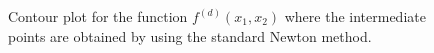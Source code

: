 \documentclass[a4paper,11pt]{article}
\begin{document}
	\begin{figure}[H]
		\centering
		 \quad
		\caption{Contour plot for the function $f^{(d)}(x_{1},x_{2})$ where the intermediate points are obtained by using the standard Newton method.}
		\label{Fig:func_d}
	\end{figure}
\end{document}
